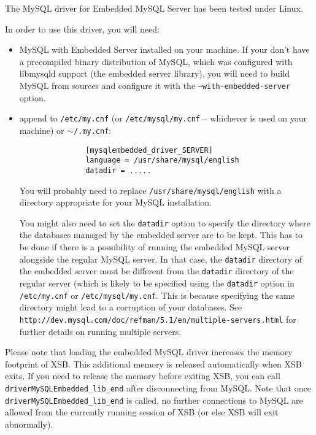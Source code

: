 The MySQL driver for Embedded MySQL Server has been tested under Linux.

\noindent
In order to use this driver, you will need:
\begin{itemize}
 \item MySQL with Embedded Server installed on your machine. If your don't
 have a precompiled binary distribution of MySQL, which was configured with
 libmysqld support (the embedded server library), you will need to build
 MySQL from sources and configure it with the {\tt --with-embedded-server} option.

 \item append to {\tt /etc/my.cnf} (or {\tt /etc/mysql/my.cnf} -- whichever
   is used on your machine) or $\sim${\tt/.my.cnf}:
       \begin{verbatim}
               [mysqlembedded_driver_SERVER]
               language = /usr/share/mysql/english
               datadir = ..... 
       \end{verbatim}
       You will probably need to replace
       {\tt /usr/share/mysql/english} with a directory
       appropriate for your MySQL installation.

       You might also need to set the {\tt datadir} option to specify
       the directory where the databases managed by the embedded server are
       to be kept. This has to be done if there is a possibility of running
       the embedded MySQL server alongside the regular MySQL server. In
       that case, the {\tt datadir} directory of the embedded server must
       be different from the {\tt datadir} directory of the regular server
       (which is likely to be specified using the {\tt datadir} option in
       {\tt /etc/my.cnf} or {\tt /etc/mysql/my.cnf}. This is because
       specifying the same directory might lead to a corruption of your
       databases. See {\tt
         http://dev.mysql.com/doc/refman/5.1/en/multiple-servers.html} for
       further details on running multiple servers.
\end{itemize}

Please note that loading the embedded MySQL driver increases the memory
footprint of XSB. This additional memory is released automatically when XSB
exits. If you need to release the memory before exiting XSB, you can call {\tt
  driverMySQLEmbedded\_lib\_end} after disconnecting from MySQL.  Note
that once {\tt driverMySQLEmbedded\_lib\_end} is called, no further
connections to MySQL are allowed from the currently running session of XSB
(or else XSB will exit abnormally).



